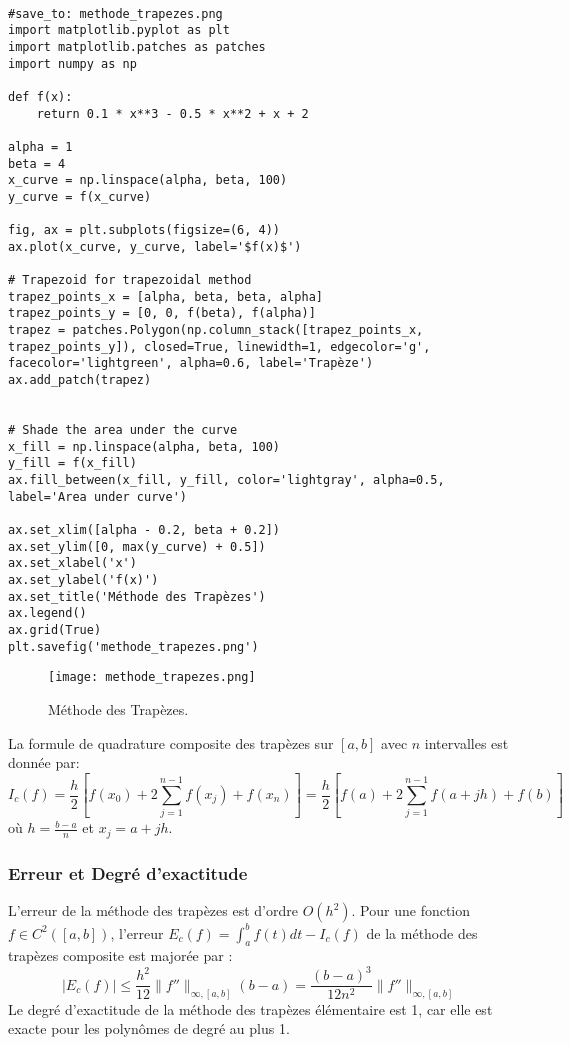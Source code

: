 \documentclass{article}
\begin{document}
\begin{verbatim}

#save_to: methode_trapezes.png
import matplotlib.pyplot as plt
import matplotlib.patches as patches
import numpy as np

def f(x):
    return 0.1 * x**3 - 0.5 * x**2 + x + 2

alpha = 1
beta = 4
x_curve = np.linspace(alpha, beta, 100)
y_curve = f(x_curve)

fig, ax = plt.subplots(figsize=(6, 4))
ax.plot(x_curve, y_curve, label='$f(x)$')

# Trapezoid for trapezoidal method
trapez_points_x = [alpha, beta, beta, alpha]
trapez_points_y = [0, 0, f(beta), f(alpha)]
trapez = patches.Polygon(np.column_stack([trapez_points_x, trapez_points_y]), closed=True, linewidth=1, edgecolor='g', facecolor='lightgreen', alpha=0.6, label='Trapèze')
ax.add_patch(trapez)


# Shade the area under the curve
x_fill = np.linspace(alpha, beta, 100)
y_fill = f(x_fill)
ax.fill_between(x_fill, y_fill, color='lightgray', alpha=0.5, label='Area under curve')

ax.set_xlim([alpha - 0.2, beta + 0.2])
ax.set_ylim([0, max(y_curve) + 0.5])
ax.set_xlabel('x')
ax.set_ylabel('f(x)')
ax.set_title('Méthode des Trapèzes')
ax.legend()
ax.grid(True)
plt.savefig('methode_trapezes.png')

\end{verbatim}

\begin{figure}[h]
    \centering
    \texttt{[image: methode\_trapezes.png]}
    \caption{Méthode des Trapèzes.}
    \label{fig:methode_trapezes}
\end{figure}

La formule de quadrature composite des trapèzes sur $[a, b]$ avec $n$ intervalles est donnée par:
\[ I_c(f) = \frac{h}{2} [f(x_0) + 2 \sum_{j=1}^{n-1} f(x_j) + f(x_n)] = \frac{h}{2} [f(a) + 2 \sum_{j=1}^{n-1} f(a + jh) + f(b)] \]
où $h = \frac{b-a}{n}$ et $x_j = a + jh$.

\subsubsection{Erreur et Degré d'exactitude}

L'erreur de la méthode des trapèzes est d'ordre $O(h^2)$. Pour une fonction $f \in C^2([a, b])$, l'erreur $E_c(f) = \int_{a}^{b} f(t) dt - I_c(f)$ de la méthode des trapèzes composite est majorée par :
\[ |E_c(f)| \leq \frac{h^2}{12} \|f''\|_{\infty,[a,b]} (b-a) = \frac{(b-a)^3}{12n^2} \|f''\|_{\infty,[a,b]} \]
Le degré d'exactitude de la méthode des trapèzes élémentaire est 1, car elle est exacte pour les polynômes de degré au plus 1.
\end{document}
